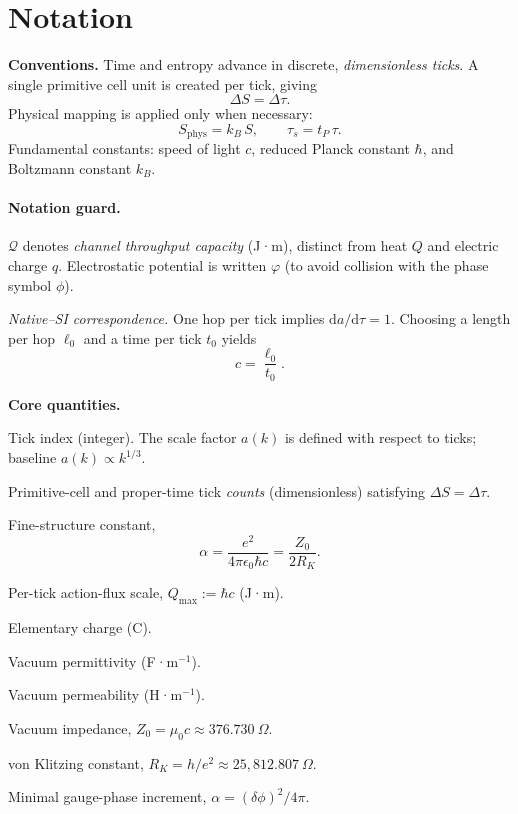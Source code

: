\section*{Notation}

\noindent\textbf{Conventions.}  
Time and entropy advance in discrete, \emph{dimensionless ticks}.   
A single primitive cell unit is created per tick, giving
\[
  \Delta S = \Delta \tau.
\]
Physical mapping is applied only when necessary:
\[
  S_{\mathrm{phys}} = k_B\,S, \qquad
  \tau_s = t_P\,\tau.
\]
Fundamental constants: speed of light \(c\), reduced Planck constant \(\hbar\), and Boltzmann constant \(k_B\).

\paragraph{Notation guard.}  
\(\mathcal Q\) denotes \emph{channel throughput capacity} (J·m), distinct from heat \(Q\) and electric charge \(q\).  
Electrostatic potential is written \(\varphi\) (to avoid collision with the phase symbol \(\phi\)).

\smallskip
\noindent\textit{Native--SI correspondence.}  
One hop per tick implies \(\mathrm{d}a/\mathrm{d}\tau = 1\).  
Choosing a length per hop \(\ell_0\) and a time per tick \(t_0\) yields
\[
  c = \frac{\ell_0}{t_0}.
\]

\bigskip
\noindent\textbf{Core quantities.}
\begin{description}[leftmargin=2.4em,labelsep=0.8em]
  \item[\(k\)] Tick index (integer). The scale factor \(a(k)\) is defined with respect to ticks; baseline \(a(k)\propto k^{1/3}\).
  \item[\(\Delta S,\,\Delta\tau\)] Primitive-cell and proper-time tick \emph{counts} (dimensionless) satisfying \(\Delta S=\Delta\tau\).
  \item[\(\alpha\)] Fine-structure constant,
        \[
          \alpha = \frac{e^2}{4\pi\epsilon_0\hbar c}
                 = \frac{Z_0}{2R_K}.
        \]
  \item[\(Q_{\max}\)] Per-tick action-flux scale, \(Q_{\max} := \hbar c\) (J·m).
  \item[\(e\)] Elementary charge (C).
  \item[\(\epsilon_0\)] Vacuum permittivity (F·m\(^{-1}\)).
  \item[\(\mu_0\)] Vacuum permeability (H·m\(^{-1}\)).
  \item[\(Z_0\)] Vacuum impedance, \(Z_0 = \mu_0 c \approx 376.730~\Omega.\)
  \item[\(R_K\)] von Klitzing constant, \(R_K = h / e^2 \approx 25{,}812.807~\Omega.\)
  \item[\(\delta\phi\)] Minimal gauge-phase increment, \(\alpha = (\delta\phi)^2 / 4\pi.\)
\end{description}

